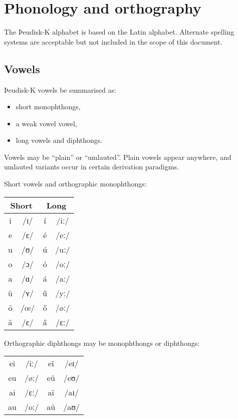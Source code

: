 \section{Phonology and orthography}

The Þeudisk-K alphabet is based on the Latin alphabet. Alternate spelling systems are acceptable but not included in the scope of this document.

\subsection{Vowels}

Þeudisk-K vowels be summarised as:

\begin{itemize}
\item short monophthongs,
\item a weak vowel vowel,
\item long vowels and diphthongs.
\end{itemize}

Vowels may be ``plain'' or ``umlauted''. Plain vowels appear anywhere, and umlauted variants occur in certain derivation paradigms.

Short vowels and orthographic monophthongs:

\begin{center}
\begin{tabular}{cc|cc}
\multicolumn{2}{c}{Short} &
\multicolumn{2}{c}{Long} \\
\hline
i & /ɪ/ & í & /iː/ \\
e & /ɛ/ & é & /eː/ \\
u & /ʊ/ & ú & /uː/ \\
o & /ɔ/ & ó & /oː/ \\
a & /ɑ/ & á & /aː/ \\
ü & /ʏ/ & \H{u} & /yː/ \\
ö & /œ/ & \H{o} & /øː/ \\
ä & /ɛ/ & \H{a} & /ɛː/ \\
\end{tabular}
\end{center}

Orthographic diphthongs may be monophthongs or diphthongs:

\begin{center}
\begin{tabular}{cc|cc}
ei & /iː/ & eï & /eɪ/ \\
eu & /øː/ & eü & /eʊ/ \\
ai & /ɛː/ & aï & /aɪ/ \\
au & /oː/ & aü & /aʊ/  \\ 
\end{tabular}
\end{center}

